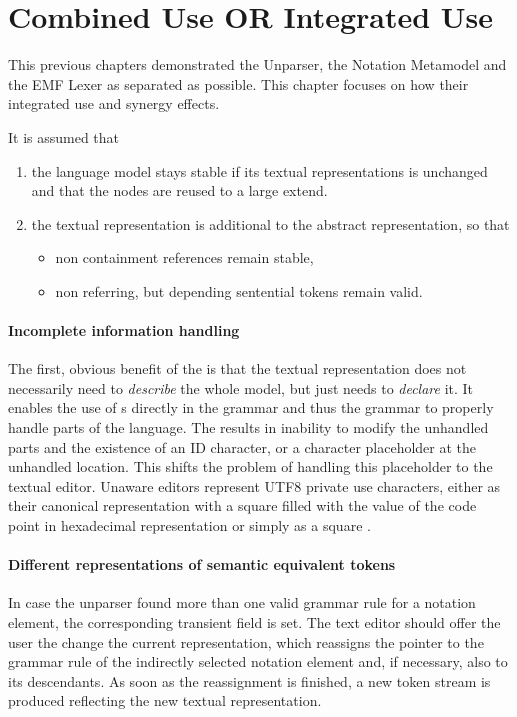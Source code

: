\section{Combined Use OR Integrated Use}

This previous chapters  demonstrated the Unparser, the Notation Metamodel and the EMF Lexer as separated as possible. This chapter focuses on how their integrated use and synergy effects. 

It is assumed that 
\begin{enumerate}
	\item the language model stays stable if its textual representations is unchanged and that the nodes are reused to a large extend.
	\item the textual representation is additional to the abstract representation, so that 
	\begin{itemize}
		\item non containment references remain stable,
		\item non  referring, but  depending sentential tokens remain valid.
	\end{itemize}
\end{enumerate}


\paragraph{Incomplete information handling}
The first, obvious benefit of the  is that the textual representation does not necessarily need to \emph{describe} the whole model, but just needs to \emph{declare} it. It enables the use of s directly in the grammar and thus the grammar to properly handle parts of the language. The results in inability to modify the unhandled parts and the existence of an ID character, or a character placeholder at the unhandled location. This shifts the problem of handling this placeholder to the textual editor. Unaware editors represent UTF8 private use characters, either as their canonical representation with a square filled with the value of the code point in hexadecimal representation or simply as a square \code{$\square$}.

\paragraph{Different representations of semantic equivalent tokens}
In case the unparser found more than one valid grammar rule for a notation element, the corresponding transient field is set. The text editor should offer the user the change the current representation, which reassigns the pointer to the grammar rule of the indirectly selected notation element and, if necessary, also to its descendants. As soon as the reassignment is finished, a new token stream is produced reflecting the new textual representation.

